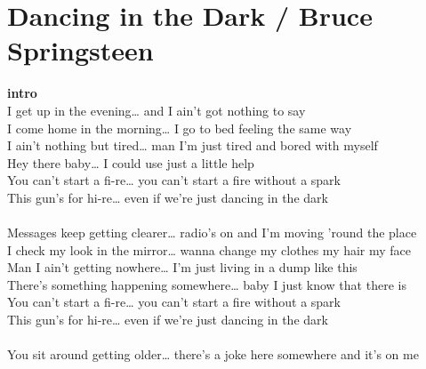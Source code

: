 \section{Dancing in the Dark / Bruce Springsteen}\label{sec:dancinginthedark}

\Gmajor
\Eminor
\Cmajor
\Aminor
\DmajorEasy

\textbf{intro}    \\
 I get up in the evening…  and I ain’t got nothing to say\\
I come home in the morning…  I go to bed feeling the same way\\
I ain't nothing but tired…  man I'm just tired and bored with myself\\
Hey there baby…  I could use just a little help\\
You can't start a fi-re… you can't start a fire without a spark\\
This gun's for hi-re…  even if we're just dancing in the dark\\
  \\
 Messages keep getting clearer…  radio's on and I'm moving 'round the place\\
I check my look in the mirror…  wanna change my clothes my hair my face\\
Man I ain't getting nowhere…  I'm just living in a dump like this\\
There's something happening somewhere…  baby I just know that there is\\
You can't start a fi-re… you can't start a fire without a spark\\
This gun's for hi-re…  even if we're just dancing in the dark\\
  \\
 You sit around getting older…  there's a joke here somewhere and it's on me\\
